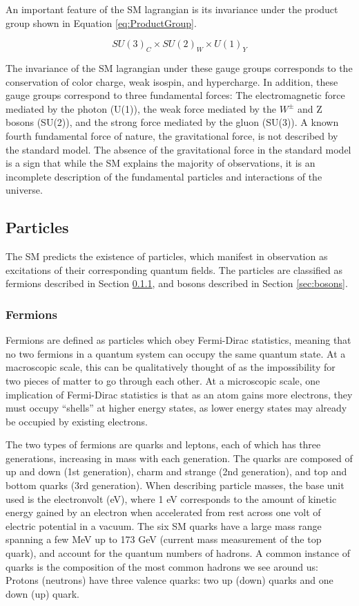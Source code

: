 An important feature of the SM lagrangian is its invariance under the product group shown in Equation \ref{eq:ProductGroup}.

\begin{equation} \label{eq:ProductGroup}
    SU(3)_{C}\times SU(2)_{W}\times U(1)_{Y}
\end{equation}

The invariance of the SM lagrangian under these gauge groups corresponds to the conservation of color charge, weak isospin, and hypercharge. In addition, these gauge groups correspond to three fundamental forces: The electromagnetic force mediated by the photon (U(1)), the weak force mediated by the $W^{\pm}$ and Z bosons (SU(2)), and the strong force mediated by the gluon (SU(3)). A known fourth fundamental force of nature, the gravitational force, is not described by the standard model. The absence of the gravitational force in the standard model is a sign that while the SM explains the majority of observations, it is an incomplete description of the fundamental particles and interactions of the universe. 

\subsection{Particles}

The SM predicts the existence of particles, which manifest in observation as excitations of their corresponding quantum fields. The particles are classified as fermions described in Section \ref{sec:fermions}, and bosons described in Section \ref{sec:bosons}.

\subsubsection{Fermions} \label{sec:fermions}

Fermions are defined as particles which obey Fermi-Dirac statistics, meaning that no two fermions in a quantum system can occupy the same quantum state. At a macroscopic scale, this can be qualitatively thought of as the impossibility for two pieces of matter to go through each other. At a microscopic scale, one implication of Fermi-Dirac statistics is that as an atom gains more electrons, they must occupy ``shells'' at higher energy states, as lower energy states may already be occupied by existing electrons. 

The two types of fermions are quarks and leptons, each of which has three generations, increasing in mass with each generation. The quarks are composed of up and down (1st generation), charm and strange (2nd generation), and top and bottom quarks (3rd generation). When describing particle masses, the base unit used is the electronvolt (eV), where 1 eV corresponds to the amount of kinetic energy gained by an electron when accelerated from rest across one volt of electric potential in a vacuum. The six SM quarks have a large mass range spanning a few MeV up to 173 GeV (current mass measurement of the top quark), and account for the quantum numbers of hadrons. A common instance of quarks is the composition of the most common hadrons we see around us: Protons (neutrons) have three valence quarks: two up (down) quarks and one down (up) quark.

